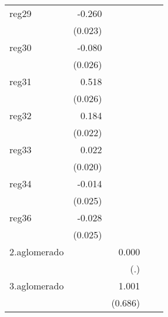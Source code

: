 {\begin{longtable}{l*{4}{D{.}{.}{-1}}}
\addlinespace
reg29       &      -0.260\sym{***}&                     &                     &                     \\
            &     (0.023)         &                     &                     &                     \\
\addlinespace
reg30       &      -0.080\sym{**} &                     &                     &                     \\
            &     (0.026)         &                     &                     &                     \\
\addlinespace
reg31       &       0.518\sym{***}&                     &                     &                     \\
            &     (0.026)         &                     &                     &                     \\
\addlinespace
reg32       &       0.184\sym{***}&                     &                     &                     \\
            &     (0.022)         &                     &                     &                     \\
\addlinespace
reg33       &       0.022         &                     &                     &                     \\
            &     (0.020)         &                     &                     &                     \\
\addlinespace
reg34       &      -0.014         &                     &                     &                     \\
            &     (0.025)         &                     &                     &                     \\
\addlinespace
reg36       &      -0.028         &                     &                     &                     \\
            &     (0.025)         &                     &                     &                     \\
\addlinespace
2.aglomerado&                     &       0.000         &                     &                     \\
            &                     &         (.)         &                     &                     \\
\addlinespace
3.aglomerado&                     &       1.001         &                     &                     \\
            &                     &     (0.686)         &                     &                     \\

\end{longtable}}
